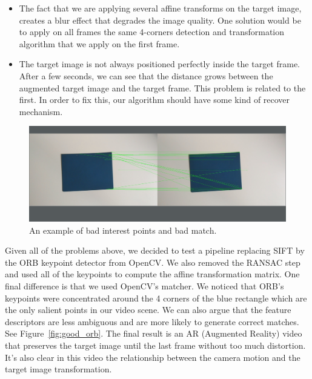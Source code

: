 \documentclass[]{IEEEtran}
\begin{document}
\begin{itemize}
\item The fact that we are applying several affine transforms on the target image, creates a blur effect that degrades the image quality. One solution would be to apply on all frames the same 4-corners detection and transformation algorithm that we apply on the first frame.
\item The target image is not always positioned perfectly inside the target frame. After a few seconds, we can see that the distance grows between the augmented target image and the target frame. This problem is related to the first. In order to fix this, our algorithm should have some kind of recover mechanism.
\end{itemize}

\begin{figure}[h]
  \includegraphics[width=\linewidth]{./figures/bad_match.png}
  \caption{An example of bad interest points and bad match.}
  \label{fig:bad_match}
\end{figure}

Given all of the problems above, we decided to test a pipeline replacing SIFT by the ORB keypoint detector from OpenCV. We also removed the RANSAC step and used all of the keypoints to compute the affine transformation matrix. One final difference is that we used OpenCV's matcher. We noticed that ORB's keypoints were concentrated around the 4 corners of the blue rectangle which are the only salient points in our video scene. We can also argue that the feature descriptors are less ambiguous and are more likely to generate correct matches. See Figure~\ref{fig:good_orb}. The final result is an AR (Augmented Reality) video that preserves the target image until the last frame without too much distortion. It's also clear in this video the relationship between the camera motion and the target image transformation.
\end{document}
